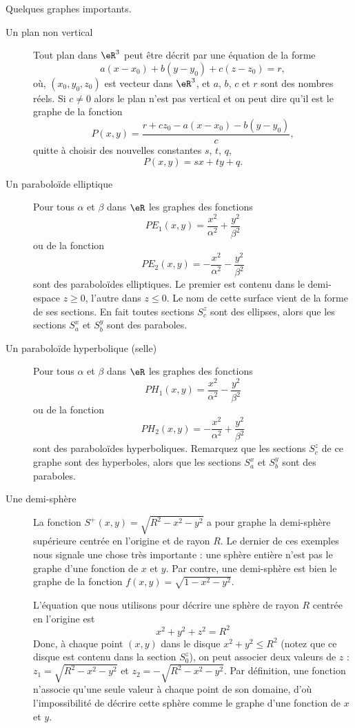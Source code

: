 \begin{example}
	Quelques graphes importants.
	\begin{description}
		\item[Un plan non vertical] Tout plan dans \( \eR^3\) peut être décrit par une équation de la forme
			\[
				a(x-x_0)+ b(y-y_0) + c(z-z_0) = r,
			\]
			où, \( (x_0, y_0, z_0)\) est vecteur dans \( \eR^3\), et \( a\), \( b\), \( c\) et \( r\) sont des nombres réels. Si \( c\neq 0\) alors le plan n'est pas vertical et on peut dire qu'il est le graphe de la fonction
			\[
				P(x,y)= \frac{r+cz_0 -a(x-x_0)-b(y-y_0)}{c},
			\]
			quitte à choisir des nouvelles constantes \( s\), \( t\), \( q\),
			\[
				P(x,y)=sx +ty +q.
			\]
		\item[Un paraboloïde elliptique] Pour tous \( \alpha\) et \( \beta\) dans \( \eR\) les  graphes des fonctions
			\[
				PE_1(x,y)=\frac{x^2}{\alpha^2}+\frac{y^2}{\beta^2}
			\]
			ou de la fonction
			\[
				PE_2(x,y)=-\frac{x^2}{\alpha^2}-\frac{y^2}{\beta^2}
			\]
			sont des paraboloïdes elliptiques. Le premier est contenu dans le demi-espace \( z\geq 0\), l'autre dans \( z\leq 0\). Le nom de cette surface vient de la forme de ses sections. En fait toutes  sections \( S^z_c\) sont des ellipses, alors que les sections \( S^x_a\) et \( S^y_b\) sont des paraboles.
		\item[Un paraboloïde hyperbolique (selle)]  Pour tous \( \alpha\) et \( \beta\) dans \( \eR\) les  graphes des fonctions
			\[
				PH_1(x,y)=\frac{x^2}{\alpha^2}-\frac{y^2}{\beta^2}
			\]
			ou de la fonction
			\[
				PH_2(x,y)=-\frac{x^2}{\alpha^2}+\frac{y^2}{\beta^2}
			\]
			sont des paraboloïdes hyperboliques. Remarquez que les  sections \( S^z_c\) de ce graphe sont des hyperboles, alors que les sections \( S^x_a\) et \( S^y_b\) sont des paraboles.
		\item[Une demi-sphère] La fonction \( S^+(x,y)=\sqrt{R^2-x^2-y^2}\) a pour graphe la demi-sphère supérieure centrée en l'origine et de rayon \( R\).
			Le dernier de ces exemples nous signale une chose très importante : une sphère entière n'est pas le graphe d'une fonction de \( x\) et \( y\). Par contre, une demi-sphère est bien le graphe de la fonction \( f(x,y)=\sqrt{1-x^2-y^2}\).

			L'équation que nous utilisons  pour décrire une sphère de rayon \( R\) centrée en l'origine est
			\[
				x^2+y^2+z^2=R^2
			\]
			Donc, à  chaque point  \( (x,y)\) dans le disque \( x^2+y^2\leq R^2\) (notez que ce disque est contenu dans la section \( S^z_0\)), on peut associer deux valeurs de \( z\) : \( z_1=\sqrt{R^2-x^2-y^2}\) et  \( z_2=-\sqrt{R^2-x^2-y^2}\). Par définition, une fonction n'associe qu'une seule valeur à chaque point de son domaine, d'où l'impossibilité de décrire cette sphère comme le graphe d'une fonction de \( x\) et \( y\).
	\end{description}
\end{example}


